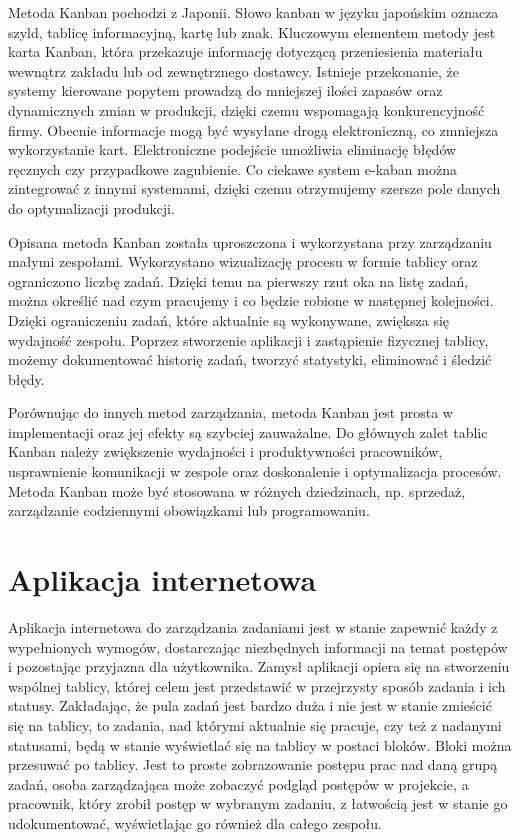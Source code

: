 \indent Metoda Kanban pochodzi z Japonii. Słowo kanban w języku japońskim oznacza szyld, tablicę informacyjną, kartę lub znak.  Kluczowym elementem metody jest karta Kanban, która przekazuje informację dotyczącą przeniesienia materiału wewnątrz zakładu lub od zewnętrznego dostawcy. Istnieje przekonanie, że systemy kierowane popytem prowadzą do mniejszej ilości zapasów oraz dynamicznych zmian w produkcji, dzięki czemu wspomagają konkurencyjność firmy. Obecnie informacje mogą być wysyłane drogą elektroniczną, co zmniejsza wykorzystanie kart. Elektroniczne podejście umożliwia eliminację błędów ręcznych czy przypadkowe zagubienie. Co ciekawe system e-kaban można zintegrować z innymi systemami, dzięki czemu otrzymujemy szersze pole danych do optymalizacji produkcji.


Opisana metoda Kanban została uproszczona i wykorzystana przy zarządzaniu małymi zespołami. Wykorzystano wizualizację procesu w formie tablicy oraz ograniczono liczbę zadań. Dzięki temu na pierwszy rzut oka na listę zadań, można określić nad czym pracujemy i co będzie robione w następnej kolejności. Dzięki ograniczeniu zadań, które aktualnie są wykonywane, zwiększa się wydajność zespołu. Poprzez stworzenie aplikacji i zastąpienie fizycznej tablicy, możemy dokumentować historię zadań, tworzyć statystyki, eliminować i śledzić błędy.


Porównując do innych metod zarządzania, metoda Kanban jest prosta w implementacji oraz jej efekty są szybciej zauważalne.  Do głównych zalet tablic Kanban należy zwiększenie wydajności i produktywności pracowników, usprawnienie komunikacji w zespole oraz doskonalenie i optymalizacja procesów. Metoda Kanban może być stosowana w różnych dziedzinach, np. sprzedaż, zarządzanie codziennymi obowiązkami lub programowaniu.


\section{Aplikacja internetowa}

Aplikacja internetowa do zarządzania zadaniami jest w stanie zapewnić każdy z wypełnionych wymogów, dostarczając niezbędnych informacji na temat postępów i pozostając przyjazna dla użytkownika. Zamysł aplikacji opiera się na stworzeniu wspólnej tablicy, której celem jest przedstawić w przejrzysty sposób zadania i ich statusy. Zakładając, że pula zadań jest bardzo duża i nie jest w stanie zmieścić się na tablicy, to zadania, nad którymi aktualnie się pracuje, czy też z nadanymi statusami, będą w stanie wyświetlać się na tablicy w postaci bloków. Bloki można przesuwać po tablicy. Jest to proste zobrazowanie postępu prac nad daną grupą zadań, osoba zarządzająca może zobaczyć podgląd postępów w projekcie, a pracownik, który zrobił postęp w wybranym zadaniu, z łatwością jest w stanie go udokumentować, wyświetlając go również dla całego zespołu. 

